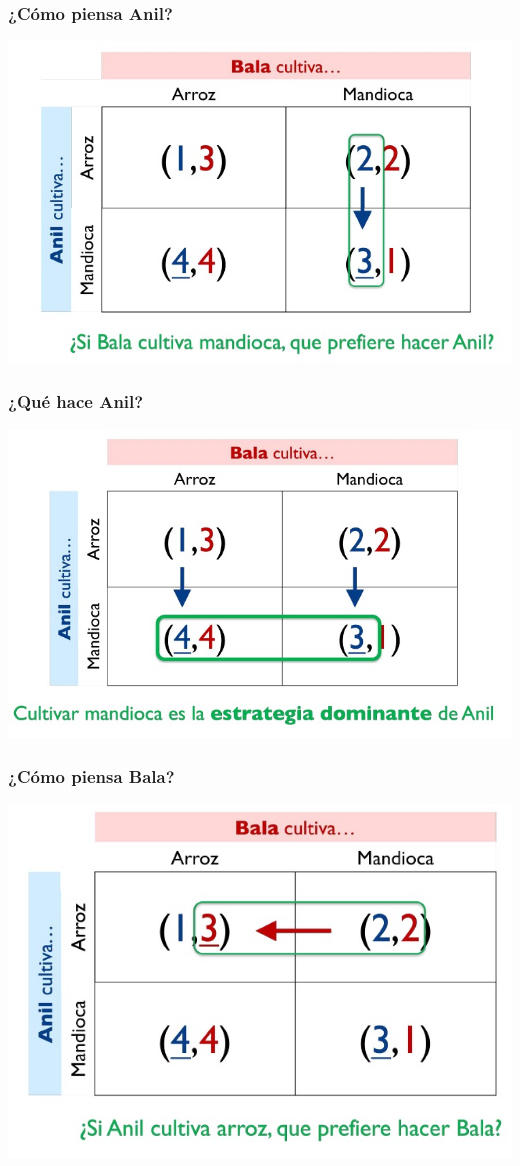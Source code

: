 \documentclass{beamer}
\begin{document}
\begin{frame}
\frametitle{ ¿Cómo piensa Anil?}
\centering
\includegraphics[scale=0.6]{Slides Principios de Economia/Figures/Tema_03_14_bala.jpg}
\end{frame}

\begin{frame}
\frametitle{ ¿Qué hace Anil?}
\centering
\includegraphics[scale=0.6]{Slides Principios de Economia/Figures/Tema_03_15_bala.jpg}
\end{frame}

\begin{frame}
\frametitle{ ¿Cómo piensa Bala?}
\centering
\includegraphics[scale=0.6]{Slides Principios de Economia/Figures/Tema_03_16_bala.jpg}
\end{frame}
\end{document}
